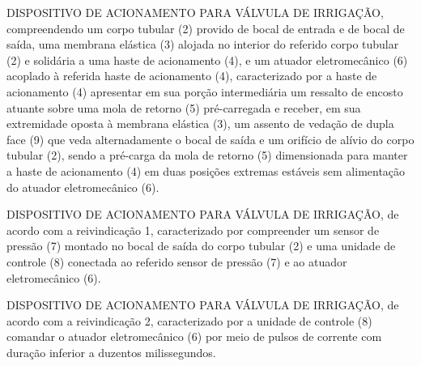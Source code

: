 \begin{quadroreivindicatorio}

\ifinvencao


\reivindicacao DISPOSITIVO DE ACIONAMENTO PARA VÁLVULA DE IRRIGAÇÃO,
compreendendo um corpo tubular (2) provido de bocal de entrada e de bocal de
saída, uma membrana elástica (3) alojada no interior do referido corpo tubular
(2) e solidária a uma haste de acionamento (4), e um atuador eletromecânico (6)
acoplado à referida haste de acionamento (4), caracterizado por a haste de
acionamento (4) apresentar em sua porção intermediária um ressalto de encosto
atuante sobre uma mola de retorno (5) pré-carregada e receber, em sua
extremidade oposta à membrana elástica (3), um assento de vedação de dupla face
(9) que veda alternadamente o bocal de saída e um orifício de alívio do corpo
tubular (2), sendo a pré-carga da mola de retorno (5) dimensionada para manter
a haste de acionamento (4) em duas posições extremas estáveis sem alimentação
do atuador eletromecânico (6).

\reivindicacao DISPOSITIVO DE ACIONAMENTO PARA VÁLVULA DE IRRIGAÇÃO, de acordo
com a reivindicação 1, caracterizado por compreender um sensor de pressão (7)
montado no bocal de saída do corpo tubular (2) e uma unidade de controle (8)
conectada ao referido sensor de pressão (7) e ao atuador eletromecânico (6).

\reivindicacao DISPOSITIVO DE ACIONAMENTO PARA VÁLVULA DE IRRIGAÇÃO, de acordo
com a reivindicação 2, caracterizado por a unidade de controle (8) comandar o
atuador eletromecânico (6) por meio de pulsos de corrente com duração inferior
a duzentos milissegundos.


\end{quadroreivindicatorio}
